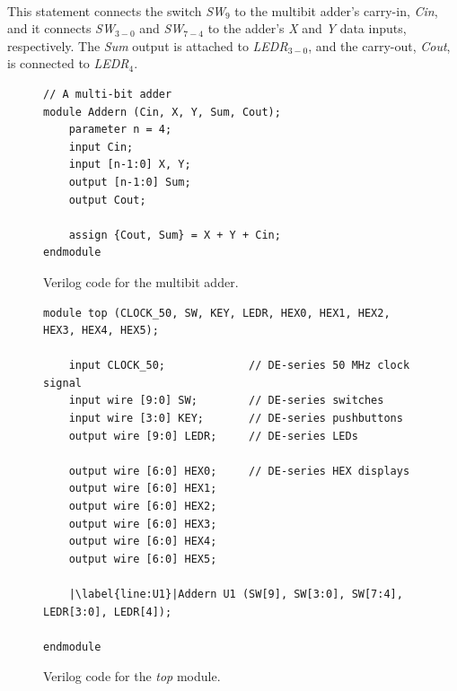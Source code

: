 \documentclass[epsfig,10pt,fullpage]{article} \addtolength{\textwidth}{1.5in}
\begin{document}
~\\
\noindent
This statement connects the switch {\it SW}$_9$ to the multibit adder's carry-in, {\it Cin}, 
and it connects {\it SW}$_{3-0}$ and  {\it SW}$_{7-4}$ to the adder's {\it X} and {\it Y} 
data inputs, respectively.  The {\it Sum} output is attached to {\it LEDR}$_{3-0}$, and 
the carry-out, {\it Cout}, is connected to {\it LEDR}$_4$.

\lstset{language=Verilog,numbers=none,escapechar=|}
\begin{figure}[h]
\begin{center}
\begin{minipage}[t]{12.5 cm}
\begin{lstlisting}[name=addern]
// A multi-bit adder
module Addern (Cin, X, Y, Sum, Cout);
    parameter n = 4;
    input Cin;
    input [n-1:0] X, Y;
    output [n-1:0] Sum;
    output Cout;

    assign {Cout, Sum} = X + Y + Cin;
endmodule
\end{lstlisting}
\end{minipage}
\caption{Verilog code for the multibit adder.}
\label{fig:addern}
\end{center}
\end{figure}

\lstset{language=Verilog,numbers=left,escapechar=|}
\begin{figure}[h]
\begin{center}
\begin{minipage}[t]{14 cm}
\begin{lstlisting}[name=top]
module top (CLOCK_50, SW, KEY, LEDR, HEX0, HEX1, HEX2, HEX3, HEX4, HEX5);

    input CLOCK_50;             // DE-series 50 MHz clock signal
    input wire [9:0] SW;        // DE-series switches
    input wire [3:0] KEY;       // DE-series pushbuttons
    output wire [9:0] LEDR;     // DE-series LEDs   

    output wire [6:0] HEX0;     // DE-series HEX displays
    output wire [6:0] HEX1;
    output wire [6:0] HEX2;
    output wire [6:0] HEX3;
    output wire [6:0] HEX4;
    output wire [6:0] HEX5;

    |\label{line:U1}|Addern U1 (SW[9], SW[3:0], SW[7:4], LEDR[3:0], LEDR[4]);

endmodule
\end{lstlisting}
\end{minipage}
    \caption{Verilog code for the {\it top} module.}
\label{fig:top}
\end{center}
\end{figure}
\end{document}
